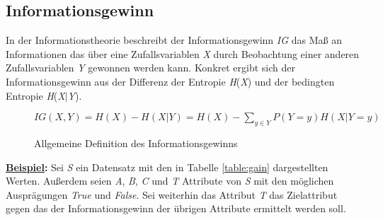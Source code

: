 \subsection{Informationsgewinn}
\label{id3:gain}
In der Informationstheorie beschreibt der Informationsgewinn \textit{IG} das Maß an Informationen das über eine Zufallsvariablen \textit{X} durch Beobachtung einer anderen Zufallsvariablen \textit{Y} gewonnen werden kann. \autocite{DataMining} Konkret ergibt sich der Informationsgewinn aus der Differenz der Entropie \textit{H}(\textit{X}) und der bedingten Entropie \textit{H}(\textit{X}$\vert$\textit{Y}). \autocite{Informat29:online}

\begin{figure}[H]
    \label{fig:gain}
    \vspace{0.5cm}
    \centering
        $ IG(X,Y) = H(X) - H(X\vert Y) = H(X) - \sum\limits_{y\in Y} P(Y=y)H(X\vert Y=y)$
    \caption{Allgemeine Definition des Informationsgewinns \autocites{DataMining}{ConditionalEntropy:online}{BedingteEntropie:online}}
\end{figure}

\textbf{\underline{Beispiel}:} Sei \textit{S} ein Datensatz mit den in Tabelle \ref{table:gain} dargestellten Werten. Außerdem seien \textit{A}, \textit{B}, \textit{C} und \textit{T} Attribute von \textit{S} mit den möglichen Ausprägungen \textit{True} und \textit{False}. Sei weiterhin das Attribut \textit{T} das Zielattribut gegen das der Informationsgewinn der übrigen Attribute ermittelt werden soll.

